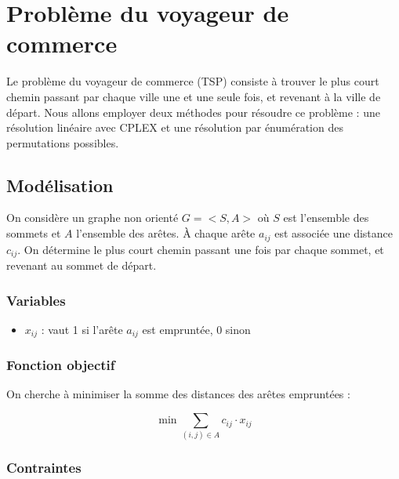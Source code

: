 \chapter{Problème du voyageur de commerce}
\label{chap:tsp}

Le problème du voyageur de commerce (TSP) consiste à trouver le plus court chemin passant par chaque ville une et une seule fois, et revenant à la ville de départ. Nous allons employer deux méthodes pour résoudre ce problème : une résolution linéaire avec CPLEX \cite{wiki_tsp} et une résolution par énumération des permutations possibles.

\section{Modélisation}
\label{sec:tsp_model}
On considère un graphe non orienté $G=<S,A>$ où $S$ est l'ensemble des sommets et $A$ l'ensemble des arêtes. À chaque arête $a_{ij}$ est associée une distance $c_{ij}$. On détermine le plus court chemin passant une fois par chaque sommet, et revenant au sommet de départ.

\subsection{Variables}

\begin{itemize}
    \item $x_{ij}$ : vaut 1 si l'arête $a_{ij}$ est empruntée, 0 sinon
\end{itemize}

\subsection{Fonction objectif}

On cherche à minimiser la somme des distances des arêtes empruntées :

\begin{equation}
    \min \sum_{(i,j) \in A} c_{ij} \cdot x_{ij}
\end{equation}

\subsection{Contraintes}

